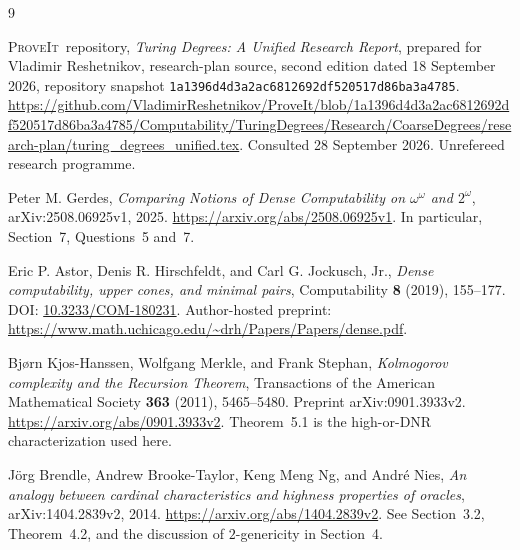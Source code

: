 \documentclass[11pt,a4paper]{article}
\newcommand{\repo}{\textsc{ProveIt}}
\theoremstyle{definition}
\theoremstyle{remark}
\begin{document}
\begin{thebibliography}{9}\raggedright
{}
\repo\ repository,
\emph{Turing Degrees: A Unified Research Report}, prepared for Vladimir Reshetnikov,
research-plan source, second edition dated 18 September 2026,
repository snapshot \texttt{1a1396d4d3a2ac6812692df520517d86ba3a4785}.
\url{https://github.com/VladimirReshetnikov/ProveIt/blob/1a1396d4d3a2ac6812692df520517d86ba3a4785/Computability/TuringDegrees/Research/CoarseDegrees/research-plan/turing_degrees_unified.tex}.
Consulted 28 September 2026. Unrefereed research programme.

Peter M. Gerdes,
\emph{Comparing Notions of Dense Computability on $\omega^\omega$ and
$2^\omega$}, arXiv:2508.06925v1, 2025.
\url{https://arxiv.org/abs/2508.06925v1}.
In particular, Section~7, Questions~5 and~7.

Eric P. Astor, Denis R. Hirschfeldt, and Carl G. Jockusch, Jr.,
\emph{Dense computability, upper cones, and minimal pairs},
Computability \textbf{8} (2019), 155--177.
DOI: \href{https://doi.org/10.3233/COM-180231}{10.3233/COM-180231}.
Author-hosted preprint:
\url{https://www.math.uchicago.edu/~drh/Papers/Papers/dense.pdf}.

Bj\o rn Kjos-Hanssen, Wolfgang Merkle, and Frank Stephan,
\emph{Kolmogorov complexity and the Recursion Theorem},
Transactions of the American Mathematical Society \textbf{363} (2011),
5465--5480. Preprint arXiv:0901.3933v2.
\url{https://arxiv.org/abs/0901.3933v2}.
Theorem~5.1 is the high-or-DNR characterization used here.

J\"org Brendle, Andrew Brooke-Taylor, Keng Meng Ng, and Andr\'e Nies,
\emph{An analogy between cardinal characteristics and highness properties
of oracles}, arXiv:1404.2839v2, 2014.
\url{https://arxiv.org/abs/1404.2839v2}.
See Section~3.2, Theorem~4.2, and the discussion of $2$-genericity
in Section~4.
\end{thebibliography}
\end{document}

